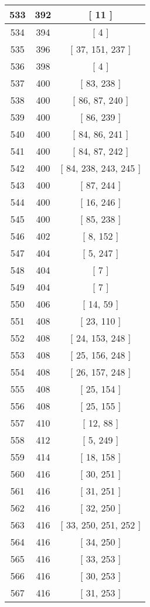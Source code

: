 \begin{center}
\begin{longtable}[H]{|| c c c ||}
\hline
533 & 392 & [ 11 ] \\ 
\hline
534 & 394 & [ 4 ] \\ 
\hline
535 & 396 & [ 37, 151, 237 ] \\ 
\hline
536 & 398 & [ 4 ] \\ 
\hline
537 & 400 & [ 83, 238 ] \\ 
\hline
538 & 400 & [ 86, 87, 240 ] \\ 
\hline
539 & 400 & [ 86, 239 ] \\ 
\hline
540 & 400 & [ 84, 86, 241 ] \\ 
\hline
541 & 400 & [ 84, 87, 242 ] \\ 
\hline
542 & 400 & [ 84, 238, 243, 245 ] \\ 
\hline
543 & 400 & [ 87, 244 ] \\ 
\hline
544 & 400 & [ 16, 246 ] \\ 
\hline
545 & 400 & [ 85, 238 ] \\ 
\hline
546 & 402 & [ 8, 152 ] \\ 
\hline
547 & 404 & [ 5, 247 ] \\ 
\hline
548 & 404 & [ 7 ] \\ 
\hline
549 & 404 & [ 7 ] \\ 
\hline
550 & 406 & [ 14, 59 ] \\ 
\hline
551 & 408 & [ 23, 110 ] \\ 
\hline
552 & 408 & [ 24, 153, 248 ] \\ 
\hline
553 & 408 & [ 25, 156, 248 ] \\ 
\hline
554 & 408 & [ 26, 157, 248 ] \\ 
\hline
555 & 408 & [ 25, 154 ] \\ 
\hline
556 & 408 & [ 25, 155 ] \\ 
\hline
557 & 410 & [ 12, 88 ] \\ 
\hline
558 & 412 & [ 5, 249 ] \\ 
\hline
559 & 414 & [ 18, 158 ] \\ 
\hline
560 & 416 & [ 30, 251 ] \\ 
\hline
561 & 416 & [ 31, 251 ] \\ 
\hline
562 & 416 & [ 32, 250 ] \\ 
\hline
563 & 416 & [ 33, 250, 251, 252 ] \\ 
\hline
564 & 416 & [ 34, 250 ] \\ 
\hline
565 & 416 & [ 33, 253 ] \\ 
\hline
566 & 416 & [ 30, 253 ] \\ 
\hline
567 & 416 & [ 31, 253 ] \\ 

\end{longtable}
\end{center}
